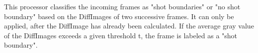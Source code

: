 This processor classifies the incoming frames as "shot boundaries" or "no shot boundary" based on the DiffImages of two successive frames. It can only be applied, after the DiffImage has already been calculated. If the average gray value of the DiffImages exceeds a given threshold t, the frame is labeled as a "shot boundary".